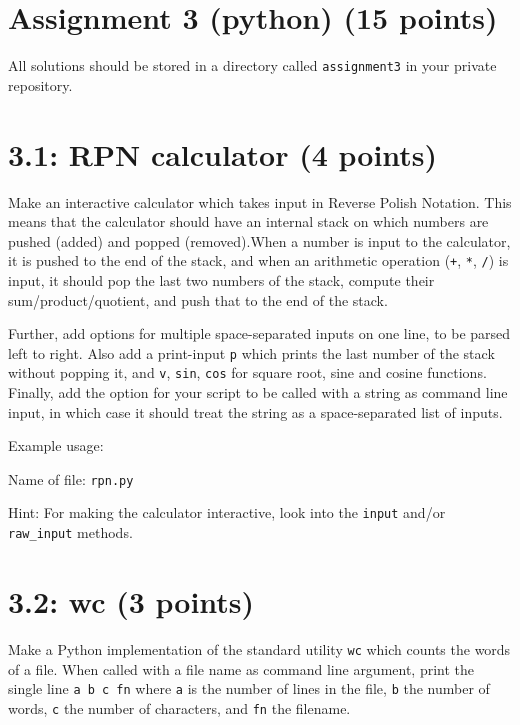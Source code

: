 \documentclass[english]{article}
\begin{document}
{\lstset{language=bash, showstringspaces=false}}
{}


\section{Assignment 3 (python) (15 points)}
All solutions should be stored in a directory called \texttt{assignment3} in your private repository.

\section{3.1: RPN calculator (4 points)}
Make an interactive calculator which takes input in Reverse Polish Notation. This means that the calculator should have an internal stack on which numbers are pushed (added) and popped (removed).When a number is input to the calculator, it is pushed to the end of the stack, and when an arithmetic operation (\texttt{+}, \texttt{*}, \texttt{/}) is input, it should pop the last two numbers of the stack, compute their sum/product/quotient, and push that to the end of the stack. 

Further, add options for multiple space-separated inputs on one line, to be parsed left to right. Also add a print-input \texttt{p} which prints the last number of the stack without popping it, and \texttt{v}, \texttt{sin}, \texttt{cos} for square root, sine and cosine functions. Finally, add the option for your script to be called with a string as command line input, in which case it should treat the string as a space-separated list of inputs.

Example usage:


 
Name of file:
\texttt{rpn.py}

Hint:
For making the calculator interactive, look into the \texttt{input} and/or \texttt{raw\_input} methods.


\section{3.2: wc (3 points)}
Make a Python implementation of the standard utility \texttt{wc} which counts the words of a file. When called with a file name as command line argument, print the single line \texttt{a  b  c  fn} where \texttt{a} is the number of lines in the file, \texttt{b} the number of words, \texttt{c} the number of characters, and \texttt{fn} the filename.
\end{document}
